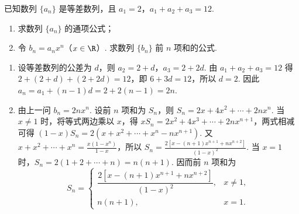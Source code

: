 \begin{problem}
已知数列 \(\{a_n\}\) 是等差数列，且 \(a_1=2\)，\(a_1+a_2+a_3=12\).
\begin{enumerate}
\item 求数列 \(\{a_n\}\) 的通项公式；
\item 令 \(b_n=a_nx^n\)（\(x\in\R\)）. 求数列 \(\{b_n\}\) 前 \(n\) 项和的公式.
\end{enumerate}

\begin{solution}
\begin{enumerate}
\item 设等差数列的公差为 \(d\)，则 \(a_2=2+d\)，\(a_3=2+2d\). 由 \(a_1+a_2+a_3=12\) 得 \(2+(2+d)+(2+2d)=12\)，即 \(6+3d=12\)，所以 \(d=2\). 因此 \(a_n=a_1+(n-1)d=2+2(n-1)=2n\).
\item 由上一问 \(b_n=2nx^n\). 设前 \(n\) 项和为 \(S_n\)，则 \(S_n=2x+4x^2+\cdots+2nx^n\). 当 \(x\ne1\) 时，将等式两边乘以 \(x\)，得 \(xS_n=2x^2+4x^3+\cdots+2nx^{n+1}\)，两式相减可得 \((1-x)S_n=2(x+x^2+\cdots+x^n-nx^{n+1})\). 又 \(x+x^2+\cdots+x^n=\frac{x(1-x^n)}{1-x}\)，所以 \(S_n=\frac{2\left[x-(n+1)x^{n+1}+nx^{n+2}\right]}{(1-x)^2}\). 当 \(x=1\) 时，\(S_n=2(1+2+\cdots+n)=n(n+1)\). 因而前 \(n\) 项和为
\[
S_n=\begin{cases}
\dfrac{2\left[x-(n+1)x^{n+1}+nx^{n+2}\right]}{(1-x)^2}, & x\ne1,\\
n(n+1), & x=1.
\end{cases}
\]
\end{enumerate}
\end{solution}
\end{problem}


